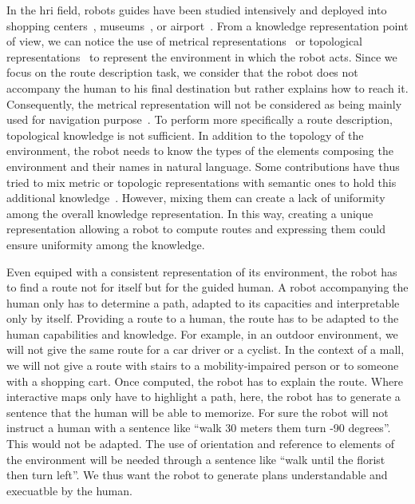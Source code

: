 In the \acrfull{hri} field, robots guides have been studied intensively and deployed into shopping centers~\cite{okuno_2009_providing}, museums~\cite{burgard_1999_museum, clodic_2006_rackham, siegwart_2003_robox}, or airport~\cite{triebel_2016_spencer}. From a knowledge representation point of view, we can notice the use of metrical representations~\cite{thrun_2007_simultaneous} or topological representations~\cite{morales_2011_modeling} to represent the environment in which the robot acts. Since we focus on the route description task, we consider that the robot does not accompany the human to his final destination but rather explains how to reach it. Consequently, the metrical representation will not be considered as being mainly used for navigation purpose~\cite{thrun_2007_simultaneous}. To perform more specifically a route description, topological knowledge is not sufficient. In addition to the topology of the environment, the robot needs to know the types of the elements composing the environment and their names in natural language. Some contributions have thus tried to mix metric or topologic representations with semantic ones to hold this additional knowledge~\cite {satake_2015_should, chrastil_2014_cognitive, zender_2008_conceptual}. However, mixing them can create a lack of uniformity among the overall knowledge representation. In this way, creating a unique representation allowing a robot to compute routes and expressing them could ensure uniformity among the knowledge.

Even equiped with a consistent representation of its environment, the robot has to find a route not for itself but for the guided human. A robot accompanying the human only has to determine a path, adapted to its capacities and interpretable only by itself. Providing a route to a human, the route has to be adapted to the human capabilities and knowledge. For example, in an outdoor environment, we will not give the same route for a car driver or a cyclist. In the context of a mall, we will not give a route with stairs to a mobility-impaired person or to someone with a shopping cart. Once computed, the robot has to explain the route. Where interactive maps only have to highlight a path, here, the robot has to generate a sentence that the human will be able to memorize. For sure the robot will not instruct a human with a sentence like ``walk 30 meters them turn -90 degrees''. This would not be adapted. The use of orientation and reference to elements of the environment will be needed through a sentence like ``walk until the florist then turn left''. We thus want the robot to generate plans understandable and execuatble by the human.


